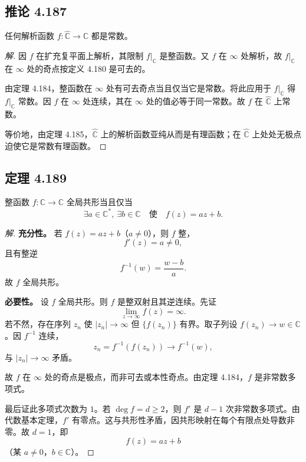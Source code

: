 \documentclass[11pt,a4paper]{article}
\newcommand{\C}{\mathbb{C}}
\newcommand{\Chat}{\widehat{\C}}
\theoremstyle{definition}
\newenvironment{solution}{\begin{proof}[解]}{\end{proof}}
\begin{document}
\subsection{推论 4.187}

任何解析函数 $f:\Chat\to\C$ 都是常数。

\begin{solution}
  因 $f$ 在扩充复平面上解析，其限制 $f|_{\C}$ 是整函数。又 $f$ 在 $\infty$ 处解析，故 $f|_{\C}$ 在 $\infty$ 处的奇点按定义 4.180 是可去的。

  由定理 4.184，整函数在 $\infty$ 处有可去奇点当且仅当它是常数。将此应用于 $f|_{\C}$ 得 $f|_{\C}$ 常数。因 $f$ 在 $\infty$ 处连续，其在 $\infty$ 处的值必等于同一常数。故 $f$ 在 $\Chat$ 上常数。

  等价地，由定理 4.185，$\Chat$ 上的解析函数亚纯从而是有理函数；在 $\Chat$ 上处处无极点迫使它是常数有理函数。
\end{solution}

\subsection{定理 4.189}

整函数 $f:\C\to\C$ 全局共形当且仅当
\[
  \exists a\in\C^\ast,\ \exists b\in\C
  \quad\text{使}\quad
  f(z)=az+b.
\]

\begin{solution}
  \textbf{充分性。}
  若 $f(z)=az+b$（$a\ne 0$），则 $f$ 整，
  \[
    f'(z)=a\ne 0,
  \]
  且有整逆
  \[
    f^{-1}(w)=\frac{w-b}{a}.
  \]
  故 $f$ 全局共形。

  \medskip
  \noindent\textbf{必要性。}
  设 $f$ 全局共形。则 $f$ 是整双射且其逆连续。先证
  \[
    \lim_{z\to\infty} f(z)=\infty.
  \]
  若不然，存在序列 $z_n$ 使 $|z_n|\to\infty$ 但 $\{f(z_n)\}$ 有界。取子列设 $f(z_n)\to w\in\C$。因 $f^{-1}$ 连续，
  \[
    z_n=f^{-1}(f(z_n))\to f^{-1}(w),
  \]
  与 $|z_n|\to\infty$ 矛盾。

  故 $f$ 在 $\infty$ 处的奇点是极点，而非可去或本性奇点。由定理 4.184，$f$ 是非常数多项式。

  最后证此多项式次数为 $1$。若 $\deg f=d\ge 2$，则 $f'$ 是 $d-1$ 次非常数多项式。由代数基本定理，$f'$ 有零点。这与共形性矛盾，因共形映射在每个有限点处导数非零。故 $d=1$，即
  \[
    f(z)=az+b
  \]
  （某 $a\ne 0$，$b\in\C$）。
\end{solution}
\end{document}
